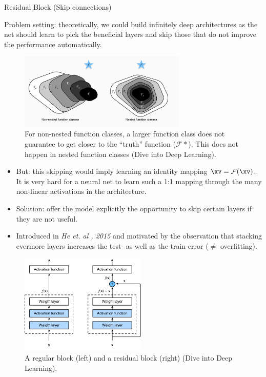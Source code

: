 \begin{vbframe}{Residual Block (Skip connections)}

Problem setting: theoretically, we could build infinitely deep architectures as the net should learn to pick the beneficial layers and skip those that do not improve the performance automatically.

 \begin{figure}
  \centering
    \includegraphics[width=8cm]{plots/moderncnn/resnet_problem.png}
    \caption{For non-nested function classes, a larger function class does not guarantee to get closer to the “truth” function ($\mathcal{F}*$). This does not happen in nested function classes (Dive into Deep Learning).}
  \end{figure}



    \begin{itemize}
        \item But: this skipping would imply learning an identity mapping $\xv = \mathcal{F}(\xv)$. It is very hard for a neural net to learn such a 1:1 mapping through the many non-linear activations in the architecture.
        \item Solution: offer the model explicitly the opportunity to skip certain layers if they are not useful.
        \item Introduced in \textit{He et. al , 2015} and motivated by the observation that stacking evermore layers increases the test- as well as the train-error ($\neq$ overfitting).
    \end{itemize}
\framebreak
 
 \begin{figure}
  \centering
    \includegraphics[width=6cm]{plots/moderncnn/residual-block.png}
    \caption{A regular block (left) and a residual block (right) (Dive into Deep Learning).}
  \end{figure}


\end{vbframe}
